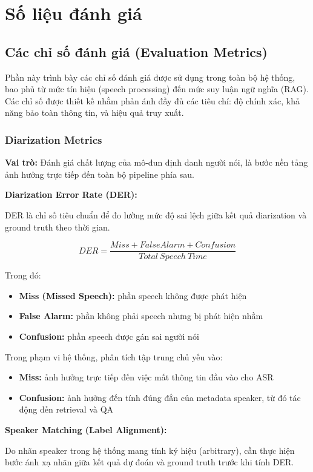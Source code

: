 \section{Số liệu đánh giá}
\subsection{Các chỉ số đánh giá (Evaluation Metrics)}

Phần này trình bày các chỉ số đánh giá được sử dụng trong toàn bộ hệ thống, bao phủ từ mức tín hiệu (speech processing) đến mức suy luận ngữ nghĩa (RAG). Các chỉ số được thiết kế nhằm phản ánh đầy đủ các tiêu chí: độ chính xác, khả năng bảo toàn thông tin, và hiệu quả truy xuất.

\subsubsection{Diarization Metrics}

\textbf{Vai trò:}
Đánh giá chất lượng của mô-đun định danh người nói, là bước nền tảng ảnh hưởng trực tiếp đến toàn bộ pipeline phía sau.

\textbf{Diarization Error Rate (DER):}

DER là chỉ số tiêu chuẩn để đo lường mức độ sai lệch giữa kết quả diarization và ground truth theo thời gian.

\[
DER = \frac{Miss + FalseAlarm + Confusion}{Total\ Speech\ Time}
\]

Trong đó:
\begin{itemize}
    \item \textbf{Miss (Missed Speech):} phần speech không được phát hiện
    \item \textbf{False Alarm:} phần không phải speech nhưng bị phát hiện nhầm
    \item \textbf{Confusion:} phần speech được gán sai người nói
\end{itemize}

Trong phạm vi hệ thống, phân tích tập trung chủ yếu vào:
\begin{itemize}
    \item \textbf{Miss:} ảnh hưởng trực tiếp đến việc mất thông tin đầu vào cho ASR
    \item \textbf{Confusion:} ảnh hưởng đến tính đúng đắn của metadata speaker, từ đó tác động đến retrieval và QA
\end{itemize}

\textbf{Speaker Matching (Label Alignment):}

Do nhãn speaker trong hệ thống mang tính ký hiệu (arbitrary), cần thực hiện bước ánh xạ nhãn giữa kết quả dự đoán và ground truth trước khi tính DER.

